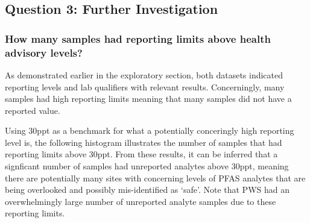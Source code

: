 \documentclass[
  12pt,
]{article}
\begin{document}
\hypertarget{question-3-further-investigation}{%
\subsection{Question 3: Further
Investigation}\label{question-3-further-investigation}}

\hypertarget{how-many-samples-had-reporting-limits-above-health-advisory-levels}{%
\subsubsection{How many samples had reporting limits above health
advisory
levels?}\label{how-many-samples-had-reporting-limits-above-health-advisory-levels}}

As demonstrated earlier in the exploratory section, both datasets
indicated reporting levels and lab qualifiers with relevant results.
Concerningly, many samples had high reporting limits meaning that many
samples did not have a reported value.

Using 30ppt as a benchmark for what a potentially conceringly high
reporting level is, the following histogram illustrates the number of
samples that had reporting limits above 30ppt. From these results, it
can be inferred that a signficant number of samples had unreported
analytes above 30ppt, meaning there are potentially many sites with
concerning levels of PFAS analytes that are being overlooked and
possibly mis-identified as `safe'. Note that PWS had an overwhelmingly
large number of unreported analyte samples due to these reporting
limits.
\end{document}
